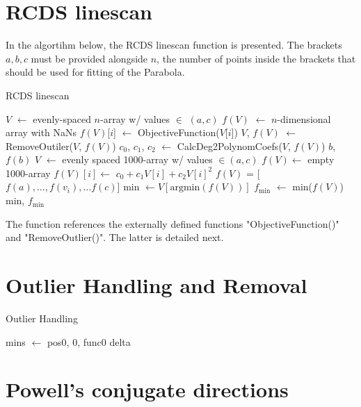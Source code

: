 \section{RCDS linescan}
In the algortihm below, the RCDS linescan function is presented. The brackets $a, b, c$ must be provided alongside $n$, the number of points inside the brackets that should be used for fitting of the Parabola.
\begin{algorithm}
    \caption{RCDS linescan}\label{alg:linescan}
    \begin{algorithmic}
        \State $V$ $\gets$ evenly-spaced $n$-array w/ values $\in$ $(a, c)$
        \State $f(V)$ $\gets$ $n$-dimensional array with NaNs
            \State $f(V)$[$i$] $\gets$ ObjectiveFunction($V$[$i$])
        \EndFor
        \State $V$, $f(V)$ $\gets$ RemoveOutiler($V$, $f(V)$)
        \State $c_0$, $c_1$, $c_2$ $\gets$ CalcDeg2PolynomCoefs($V$, $f(V)$)
            \State \Return $b$, $f(b)$
        \EndIf
        \State $V$ $\gets$ evenly spaced 1000-array w/ values $\in(a,c)$
        \State $f(V)\gets$ empty 1000-array
            \State $f(V)[i] \gets$ $c_0+c_1V[i]+c_2V[i]^2$
        \EndFor
        \State $f(V)$ = [$f(a),\dots,f(v_i),\dots f(c)$]
        \State min $\gets V[\text{argmin}(f(V))]$
        \State $f_\text{min}$ $\gets$ min($f(V)$)
        \State \Return min, $f_\text{min}$
    \EndFunction
    \end{algorithmic}
    \end{algorithm}
The function references the externally defined functions "ObjectiveFunction()" and "RemoveOutlier()". The latter is detailed next.
\section{Outlier Handling and Removal}
\begin{algorithm}
    \caption{Outlier Handling}\label{alg:outlier}
    \begin{algorithmic}
        \State mins $\gets$ pos0, 0, func0
        \State delta
    \EndFunction
    \end{algorithmic}
    \end{algorithm}

\section{Powell's conjugate directions}
